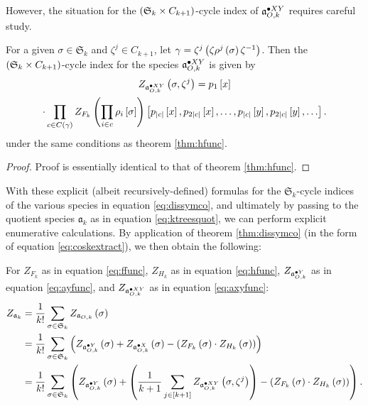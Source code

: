 \documentclass[sectionflow,singlespace,twoside,boldmathhdr]{brandiss} %
\numberwithin{section}{chapter}
\numberwithin{figure}{chapter}
\begin{document}
However, the situation for the $\pbrac{\mathfrak{S}_{k} \times C_{k+1}}$-cycle index of $\pointed[XY]{\mathfrak{a}}_{O, k}$ requires careful study.
\begin{theorem}
  \label{thm:axyfunc}
  For a given $\sigma \in \mathfrak{S}_{k}$ and $\zeta^{j} \in C_{k+1}$, let $\gamma = \zeta^{j} \pbrac{\zeta \rho^{j} \pbrac{\sigma} \zeta^{-1}}$.
  Then the $\pbrac{\mathfrak{S}_{k} \times C_{k+1}}$-cycle index for the species $\pointed[XY]{\mathfrak{a}}_{O, k}$ is given by
  \begin{multline}
    \label{eq:axyfunc}
    Z_{\pointed[XY]{\mathfrak{a}}_{O, k}} \pbrac{\sigma, \zeta^{j}} = p_{1} \sbrac{x} \\
    \cdot \prod_{c \in C \pbrac{\gamma}} Z_{F_{k}} \pbrac{\prod_{i \in c} \rho_{i} \sbrac{\sigma}} \sbrac{p_{\abs{c}} \sbrac{x}, p_{2 \abs{c}} \sbrac{x}, \dots, p_{\abs{c}} \sbrac{y}, p_{2 \abs{c}} \sbrac{y}, \dots}.
  \end{multline}
  under the same conditions as theorem \ref{thm:hfunc}.
\end{theorem}

\begin{proof}
  Proof is essentially identical to that of theorem \ref{thm:hfunc}.
\end{proof}

With these explicit (albeit recursively-defined) formulas for the $\mathfrak{S}_{k}$-cycle indices of the various species in equation \eqref{eq:dissymco}, and ultimately by passing to the quotient species $\mathfrak{a}_{k}$ as in equation \eqref{eq:ktreesquot}, we can perform explicit enumerative calculations.
By application of theorem \ref{thm:dissymco} (in the form of equation \eqref{eq:coskextract}), we then obtain the following:

\begin{theorem}
  \label{thm:ktreecyc}
  For $Z_{F_{k}}$ as in equation \eqref{eq:ffunc}, $Z_{H_{k}}$ as in equation \eqref{eq:hfunc}, $Z_{\pointed[Y]{\mathfrak{a}}_{O, k}}$ as in equation \eqref{eq:ayfunc}, and $Z_{\pointed[XY]{\mathfrak{a}}_{O, k}}$ as in equation \eqref{eq:axyfunc}:
  \begin{subequations}
    \begin{align}
      Z_{\mathfrak{a}_{k}} &= \frac{1}{k!} \sum_{\sigma \in \mathfrak{S}_{k}} Z_{\mathfrak{a}_{O, k}} \pbrac{\sigma} \\
      &= \frac{1}{k!} \sum_{\sigma \in \mathfrak{S}_{k}} \pbrac{Z_{\pointed[Y]{\mathfrak{a}}_{O, k}} \pbrac{\sigma} + Z_{\pointed[X]{\mathfrak{a}}_{O, k}} \pbrac{\sigma} - \pbrac{Z_{F_{k}} \pbrac{\sigma} \cdot Z_{H_{k}} \pbrac{\sigma}}} \\
      &= \frac{1}{k!} \sum_{\sigma \in \mathfrak{S}_{k}}
      \pbrac{Z_{\pointed[Y]{\mathfrak{a}}_{O, k}} \pbrac{\sigma} +
        \pbrac{\frac{1}{k+1} \sum_{j \in \sbrac{k+1}}
          Z_{\pointed[XY]{\mathfrak{a}}_{O, k}} \pbrac{\sigma,
            \zeta^{j}}} - \pbrac{Z_{F_{k}} \pbrac{\sigma} \cdot
          Z_{H_{k}} \pbrac{\sigma}}}.
    \end{align}
  \end{subequations}

\end{theorem}
\end{document}
